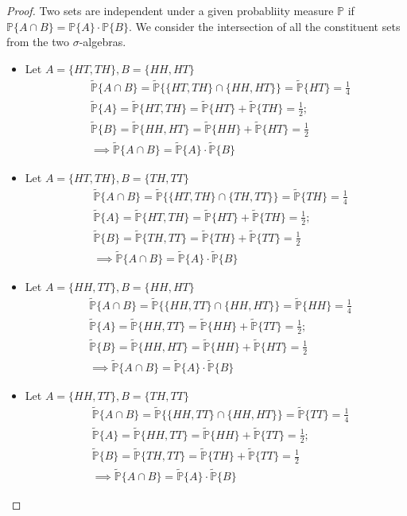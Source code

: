 \documentclass{article}
\newcommand{\p}{\mathbb{P}}
\newcommand{\tp}{\tilde{\p}}
\newcommand{\seq}[1]{\{ #1 \}}
\theoremstyle{definition}
\theoremstyle{definition}
\begin{document}
\begin{enumerate}
\begin{enumerate}[(i)]
    \begin{proof}
    Two sets are independent under a given probabliity measure $\p$ if $\p\seq{A \cap B} = \p\{A\}\cdot \p\{B\}$. We consider the intersection of all the constituent sets from the two $\sigma$-algebras.
    \begin{itemize}
    \item Let $A = \seq{HT,TH},B= \seq{HH,HT}$
    \begin{align*}
        &\tp\seq{A \cap B} = \tp\seq{\seq{HT,TH} \cap \seq{HH,HT}} = \tp\seq{HT} = \frac{1}{4} \\
        &\tp\seq{A} = \tp\seq{HT,TH} = \tp\{HT\}+\tp\{TH\} = \frac{1}{2};\\
         & \tp\seq{B} =\tp\seq{HH,HT} = \tp\{HH\}+\tp\{HT\} = \frac{1}{2} \\
         & \implies  \tp\seq{A \cap B} = \tp\seq{A}\cdot \tp\seq{B}
    \end{align*}
        \item Let $A = \seq{HT,TH},B= \seq{TH,TT}$
    \begin{align*}
        &\tp\seq{A \cap B} = \tp\seq{\seq{HT,TH} \cap \seq{TH,TT}} = \tp\seq{TH} = \frac{1}{4} \\
        &\tp\seq{A} = \tp\seq{HT,TH} = \tp\{HT\}+\tp\{TH\} = \frac{1}{2};\\
         & \tp\seq{B} =\tp\seq{TH,TT} = \tp\{TH\}+\tp\{TT\} = \frac{1}{2} \\
         & \implies  \tp\seq{A \cap B} = \tp\seq{A}\cdot \tp\seq{B}
    \end{align*}
            \item Let $A = \seq{HH,TT},B= \seq{HH,HT}$
    \begin{align*}
        &\tp\seq{A \cap B} = \tp\seq{\seq{HH,TT} \cap \seq{HH,HT}} = \tp\seq{HH} = \frac{1}{4} \\
        &\tp\seq{A} = \tp\seq{HH,TT} = \tp\{HH\}+\tp\{TT\} = \frac{1}{2};\\
         & \tp\seq{B} =\tp\seq{HH,HT} = \tp\{HH\}+\tp\{HT\} = \frac{1}{2} \\
         & \implies  \tp\seq{A \cap B} = \tp\seq{A}\cdot \tp\seq{B}
    \end{align*}
                \item Let $A = \seq{HH,TT},B= \seq{TH,TT}$
    \begin{align*}
        &\tp\seq{A \cap B} = \tp\seq{\seq{HH,TT} \cap \seq{HH,HT}} = \tp\seq{TT} = \frac{1}{4} \\
        &\tp\seq{A} = \tp\seq{HH,TT} = \tp\{HH\}+\tp\{TT\} = \frac{1}{2};\\
         & \tp\seq{B} =\tp\seq{TH,TT} = \tp\{TH\}+\tp\{TT\} = \frac{1}{2} \\
         & \implies  \tp\seq{A \cap B} = \tp\seq{A}\cdot \tp\seq{B}
    \end{align*}
    \end{itemize}
    

\end{proof}
\end{enumerate}
\end{enumerate}
\end{document}
